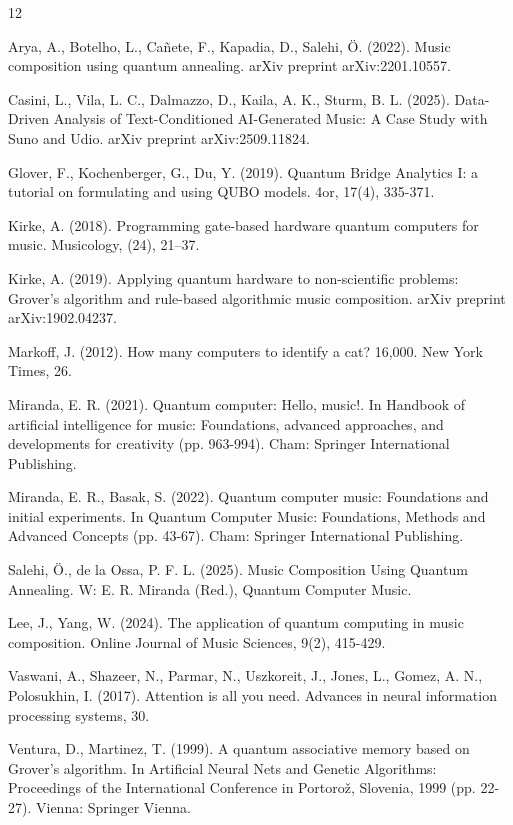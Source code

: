 \begin{thebibliography}{12}

Arya, A., Botelho, L., Cañete, F., Kapadia, D., Salehi, Ö. (2022). Music composition using quantum annealing. arXiv preprint arXiv:2201.10557.

Casini, L., Vila, L. C., Dalmazzo, D., Kaila, A. K., Sturm, B. L. (2025). Data-Driven Analysis of Text-Conditioned AI-Generated Music: A Case Study with Suno and Udio. arXiv preprint arXiv:2509.11824.

Glover, F., Kochenberger, G., Du, Y. (2019). Quantum Bridge Analytics I: a tutorial on formulating and using QUBO models. 4or, 17(4), 335-371.

Kirke, A. (2018). Programming gate-based hardware quantum computers for music. Musicology, (24), 21–37.

Kirke, A. (2019). Applying quantum hardware to non-scientific problems: Grover’s algorithm and rule-based algorithmic music composition. arXiv preprint arXiv:1902.04237.

Markoff, J. (2012). How many computers to identify a cat? 16,000. New York Times, 26.

Miranda, E. R. (2021). Quantum computer: Hello, music!. In Handbook of artificial intelligence for music: Foundations, advanced approaches, and developments for creativity (pp. 963-994). Cham: Springer International Publishing.

Miranda, E. R., Basak, S. (2022). Quantum computer music: Foundations and initial experiments. In Quantum Computer Music: Foundations, Methods and Advanced Concepts (pp. 43-67). Cham: Springer International Publishing.

Salehi, Ö., de la Ossa, P. F. L. (2025). Music Composition Using Quantum Annealing. W: E. R. Miranda (Red.), Quantum Computer Music.

Lee, J., Yang, W. (2024). The application of quantum computing in music composition. Online Journal of Music Sciences, 9(2), 415-429.

Vaswani, A., Shazeer, N., Parmar, N., Uszkoreit, J., Jones, L., Gomez, A. N., Polosukhin, I. (2017). Attention is all you need. Advances in neural information processing systems, 30.

Ventura, D., Martinez, T. (1999). A quantum associative memory based on Grover’s algorithm. In Artificial Neural Nets and Genetic Algorithms: Proceedings of the International Conference in Portorož, Slovenia, 1999 (pp. 22-27). Vienna: Springer Vienna.

\end{thebibliography}

